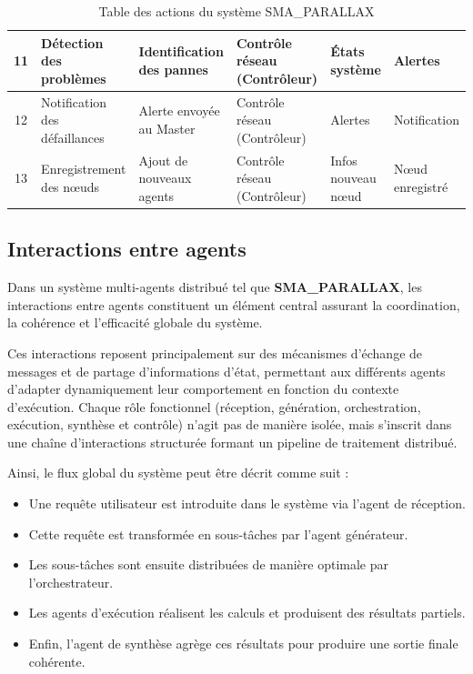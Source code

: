 \documentclass[12pt,a4paper]{report}
\theoremstyle{definition}
\begin{document}
\begin{table}[H]
\begin{tabular}{|c|p{3cm}|p{4cm}|p{3cm}|p{2cm}|p{2cm}|}
11 & Détection des problèmes & Identification des pannes & Contrôle réseau (Contrôleur) & États système & Alertes \\
\hline

12 & Notification des défaillances & Alerte envoyée au Master & Contrôle réseau (Contrôleur) & Alertes & Notification \\
\hline

13 & Enregistrement des nœuds & Ajout de nouveaux agents & Contrôle réseau (Contrôleur) & Infos nouveau nœud & Nœud enregistré \\
\hline

\end{tabular}
\caption{Table des actions du système SMA\_PARALLAX}
\end{table}


\subsection{Interactions entre agents}

Dans un système multi-agents distribué tel que \textbf{SMA\_PARALLAX}, les interactions entre agents constituent un élément central assurant la coordination, la cohérence et l’efficacité globale du système. 

Ces interactions reposent principalement sur des mécanismes d’échange de messages et de partage d’informations d’état, permettant aux différents agents d’adapter dynamiquement leur comportement en fonction du contexte d’exécution. Chaque rôle fonctionnel (réception, génération, orchestration, exécution, synthèse et contrôle) n’agit pas de manière isolée, mais s’inscrit dans une chaîne d’interactions structurée formant un pipeline de traitement distribué.

Ainsi, le flux global du système peut être décrit comme suit :
\begin{itemize}
    \item Une requête utilisateur est introduite dans le système via l’agent de réception.
    \item Cette requête est transformée en sous-tâches par l’agent générateur.
    \item Les sous-tâches sont ensuite distribuées de manière optimale par l’orchestrateur.
    \item Les agents d’exécution réalisent les calculs et produisent des résultats partiels.
    \item Enfin, l’agent de synthèse agrège ces résultats pour produire une sortie finale cohérente.
\end{itemize}
\end{document}
